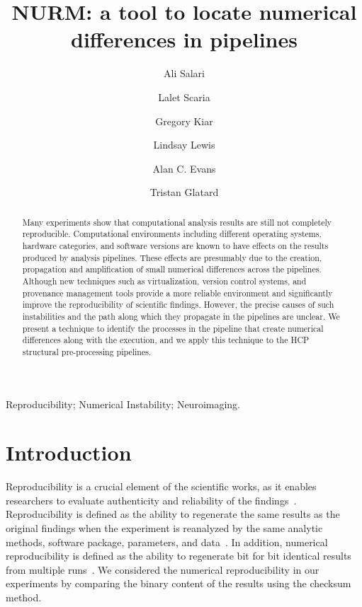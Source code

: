 \documentclass[a4paper,num-refs]{oup-contemporary}
\title{NURM: a tool to 
locate numerical differences in pipelines}
\begin{document}
\author[1]{Ali Salari}
\author[1]{Lalet Scaria}
\author[2,3]{Gregory Kiar}
\author[2]{Lindsay Lewis}
\author[2,3]{Alan C. Evans}
\author[1]{Tristan Glatard}


\maketitle

\begin{abstract} 

Many experiments show that computational analysis results are still not 
completely reproducible. Computational environments including different 
operating systems, hardware categories, and software versions are known 
to have effects on the results produced by analysis pipelines. These 
effects are presumably due to the creation, propagation and 
amplification of small numerical differences across the pipelines. 
Although new techniques such as virtualization, version control 
systems, and provenance management tools provide a more reliable 
environment and significantly improve the reproducibility of scientific 
findings. However, the precise causes of such instabilities and the 
path along which they propagate in the pipelines are unclear.  We 
present a technique to identify the processes in the pipeline that 
create numerical differences along with the execution, and we apply this 
technique to the HCP structural pre-processing pipelines.

\end{abstract}

\begin{keywords}
Reproducibility; Numerical Instability; Neuroimaging.
\end{keywords}

\section{Introduction}

Reproducibility is a crucial element of the scientific works, 
as it enables researchers to evaluate authenticity and reliability 
of the findings~\cite{plesser2018reproducibility}.
Reproducibility is defined as the ability to regenerate the same 
results as the original findings when the experiment is reanalyzed by 
the same analytic methods, software package, parameters, and 
data~\cite{peng2011reproducible}. 
In addition, numerical reproducibility is defined as the ability to 
regenerate bit for bit identical results from multiple 
runs~\cite{hill2017numerical}. 
We considered the numerical reproducibility in our experiments by comparing 
the binary content of the results using the checksum method.
\end{document}
